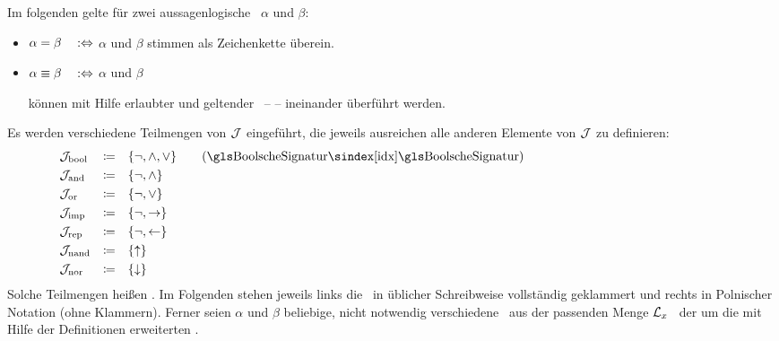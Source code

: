 Im folgenden gelte für zwei aussagenlogische \Formeln\ $\alpha$ und $\beta$:
\begin{itemize}
	\item[] $\alpha =    \beta \quad :\Leftrightarrow$ \quad $\alpha$ und $\beta$
	stimmen als Zeichenkette überein.
	\item[] $\alpha \equiv \beta \quad :\Leftrightarrow$ \quad $\alpha$ und $\beta$
	\parbox[t]{11cm}{können mit Hilfe erlaubter  und geltender \Axiome\ --  -- ineinander überführt werden.}
\end{itemize}
%
Es werden verschiedene Teilmengen von $\mathcal{J}$ eingeführt, die jeweils ausreichen alle anderen Elemente von $\mathcal{J}$ zu definieren:
\begin{align}
	& \alJun_\iBool & \defeq & \quad\{ \lnot, \land, \lor \} \label{def:Jbool}
	\qquad (\text{\BoolscheSignatur})
	\\
	& \alJun_\iAnd  & \defeq & \quad\{ \lnot, \land       \} \label{def:Jand}
	\\
	& \alJun_\iOr   & \defeq & \quad\{ \lnot, \lor        \} \label{def:Jor}
	\\
	& \alJun_\iImp  & \defeq & \quad\{ \lnot, \limp       \} \label{def:Jimp}
	\\
	& \alJun_\iRep  & \defeq & \quad\{ \lnot, \lrep       \} \label{def:Jrep}
	\\
	& \alJun_\iNand & \defeq & \quad\{ \lnand             \} \label{def:Jnand}
	\\
	& \alJun_\iNor  & \defeq & \quad\{ \lnor              \} \label{def:Jnor}
	\formulatoleft\formulatoleft\formulatoleft
\end{align}
Solche Teilmengen heißen .
%
Im Folgenden stehen jeweils links die \Formeln\ in üblicher Schreibweise vollständig geklammert und rechts in Polnischer Notation (ohne Klammern).
Ferner seien $\alpha$ und $\beta$ beliebige, nicht notwendig verschiedene \Formeln\ aus der passenden Menge $\mathcal{L}_x$ \textbzgl\ der um die mit Hilfe der Definitionen erweiterten \Formelmenge.

